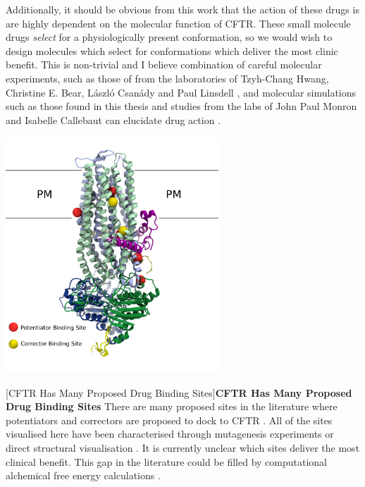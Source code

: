 Additionally, it should be obvious from this work that the action of these drugs is are highly dependent on the molecular function of CFTR. These small molecule drugs \textit{select} for a physiologically present conformation, so we would wish to design molecules which select for conformations which deliver the most clinic benefit. This is non-trivial and I believe  combination of careful molecular experiments, such as those of from the laboratories of Tzyh-Chang Hwang,  Christine E. Bear, L\'aszl\'o Csan\'ady and Paul Linsdell \cite{linsdell2018, csanady2019, laselva2021a, laselva2022, zhang2017b}, and molecular simulations such as those found in this thesis and studies from the labs of John Paul Monron and Isabelle Callebaut can elucidate drug action \cite{hoffmann2018}.

\begin{center}
	\includegraphics[width=0.6\textwidth]{figures/many_drug_sites.pdf}
\end{center}
\begingroup
\captionsetup{singlelinecheck = false, justification=raggedright}
[CFTR Has Many Proposed Drug Binding Sites]{\textbf{CFTR Has Many Proposed Drug Binding Sites} {There are many proposed sites in the literature where potentiators and correctors are proposed to dock to CFTR . All of the sites visualised here have been characterised through mutagenesis experiments or direct structural visualisation \cite{yeh2019, laselva2021a, liu2019, baatallah2021}. It is currently unclear which sites deliver the most clinical benefit. This gap in the literature could be filled by computational alchemical free energy calculations \cite{jorgensen2008,chipot2007}. }}
\label{many_drug_bound_CFTR}
\endgroup

